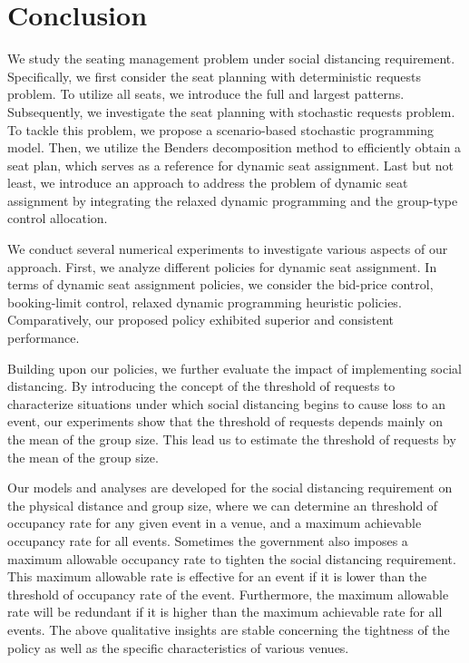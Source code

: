 \section{Conclusion}\label{sec_conclusion}
We study the seating management problem under social distancing requirement. Specifically, we first consider the seat planning with deterministic requests problem. To utilize all seats, we introduce the full and largest patterns. Subsequently, we investigate the seat planning with stochastic requests problem. To tackle this problem, we propose a scenario-based stochastic programming model. Then, we utilize the Benders decomposition method to efficiently obtain a seat plan, which serves as a reference for dynamic seat assignment. Last but not least, we introduce an approach to address the problem of dynamic seat assignment by integrating the relaxed dynamic programming and the group-type control allocation. 

We conduct several numerical experiments to investigate various aspects of our approach. First, we analyze different policies for dynamic seat assignment. In terms of dynamic seat assignment policies, we consider the bid-price control, booking-limit control, relaxed dynamic programming heuristic policies. Comparatively, our proposed policy exhibited superior and consistent performance.

Building upon our policies, we further evaluate the impact of implementing social distancing. By introducing the concept of the threshold of requests to characterize situations under which social distancing begins to cause loss to an event, our experiments show that the threshold of requests depends mainly on the mean of the group size. This lead us to estimate the threshold of requests by the mean of the group size.


Our models and analyses are developed for the social distancing requirement on the physical distance and group size, where we can determine an threshold of occupancy rate for any given event in a venue, and a maximum achievable occupancy rate for all events. Sometimes the government also imposes a maximum allowable occupancy rate to tighten the social distancing requirement. This maximum allowable rate is effective for an event if it is lower than the threshold of occupancy rate of the event. Furthermore, the maximum allowable rate will be redundant if it is higher than the maximum achievable rate for all events. The above qualitative insights are stable concerning the tightness of the policy as well as the specific characteristics of various venues.


